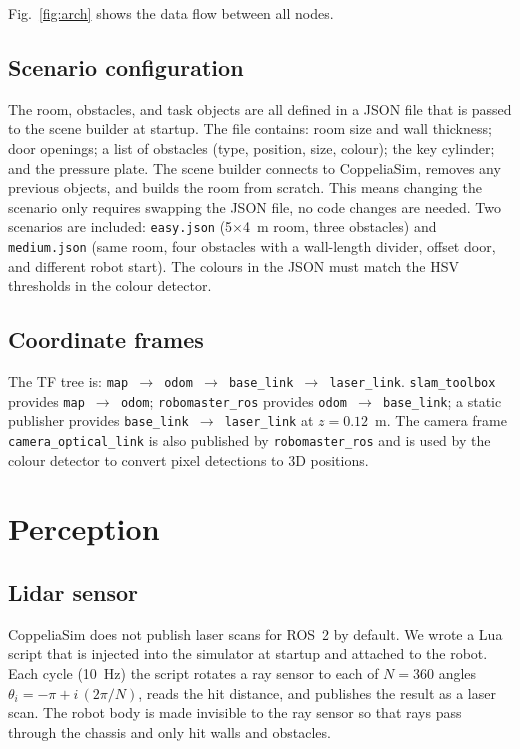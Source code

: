 \documentclass[conference]{IEEEtran}
\begin{document}
Fig.~\ref{fig:arch} shows the data flow between all nodes.

\subsection{Scenario configuration}

The room, obstacles, and task objects are all defined in a JSON file
that is passed to the scene builder at startup.
The file contains: room size and wall thickness; door openings;
a list of obstacles (type, position, size, colour); the key cylinder;
and the pressure plate.
The scene builder connects to CoppeliaSim, removes any previous
objects, and builds the room from scratch.
This means changing the scenario only requires swapping the JSON file,
no code changes are needed.
Two scenarios are included: \texttt{easy.json} (5$\times$4~m room,
three obstacles) and \texttt{medium.json} (same room, four obstacles
with a wall-length divider, offset door, and different robot start).
The colours in the JSON must match the HSV thresholds in the
colour detector.

\subsection{Coordinate frames}

The TF tree is:
\texttt{map\,$\to$\,odom\,$\to$\,base\_link\,$\to$\,laser\_link}.
\texttt{slam\_toolbox} provides \texttt{map\,$\to$\,odom};
\texttt{robomaster\_ros} provides \texttt{odom\,$\to$\,base\_link};
a static publisher provides \texttt{base\_link\,$\to$\,laser\_link}
at $z = 0.12$~m.
The camera frame \texttt{camera\_optical\_link} is also published
by \texttt{robomaster\_ros} and is used by the colour detector to
convert pixel detections to 3D positions.

\section{Perception}
\label{sec:perception}

\subsection{Lidar sensor}

CoppeliaSim does not publish laser scans for ROS~2 by default.
We wrote a Lua script that is injected into the simulator at startup
and attached to the robot.
Each cycle (10~Hz) the script rotates a ray sensor to each of
$N = 360$ angles $\theta_i = -\pi + i\,(2\pi/N)$, reads the hit
distance, and publishes the result as a laser scan.
The robot body is made invisible to the ray sensor so that rays
pass through the chassis and only hit walls and obstacles.
\end{document}
